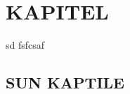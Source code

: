 \documentclass[
]{article}
\author{}
\date{}
\begin{document}


\pagestyle{plain}
% 


\tableofcontents


\pagestyle{scrheadings}
\renewcommand{\chaptermark}[1]{\markboth{\thechapter\hspace{1cm}#1}{}}	%
\chead{}		%
\ihead{\leftmark}	%
\renewcommand{\headfont}{\bfseries}	%
\setheadsepline{0.5pt}






\hypertarget{kapitel}{%
\section{KAPITEL}\label{kapitel}}

sd fsfcsaf

\hypertarget{sun-kaptile}{%
\subsection{SUN KAPTILE}\label{sun-kaptile}}
\end{document}
